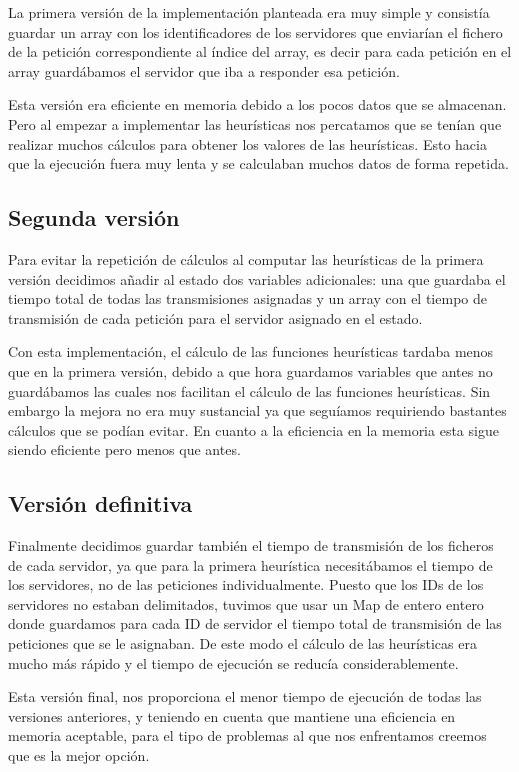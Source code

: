 La primera versión de la implementación planteada era muy simple y consistía guardar un array con los identificadores
de los servidores que enviarían el fichero de la petición correspondiente al índice del array, es decir para cada
petición en el array guardábamos el servidor que iba a responder esa petición.

Esta versión era eficiente en memoria debido a los pocos datos que se almacenan. Pero al empezar a implementar las heurísticas
nos percatamos que se tenían que realizar muchos cálculos para obtener los valores de las heurísticas. Esto hacia que la
ejecución fuera muy lenta y se calculaban muchos datos de forma repetida.

\pagebreak
\subsection{Segunda versión}
Para evitar la repetición de cálculos al computar las heurísticas de la primera versión decidimos añadir al estado
dos variables adicionales: una que guardaba el tiempo total de todas las transmisiones asignadas y un array con
el tiempo de transmisión de cada petición para el servidor asignado en el estado.

Con esta implementación, el cálculo de las funciones heurísticas tardaba menos que en la primera versión,
debido a que hora guardamos variables que antes no guardábamos las cuales nos facilitan el cálculo de las funciones heurísticas.
Sin embargo la mejora no era muy sustancial ya que seguíamos requiriendo bastantes cálculos que se podían evitar.
En cuanto a la eficiencia en la memoria esta sigue siendo eficiente pero menos que antes.

\subsection{Versión definitiva}

Finalmente decidimos guardar también el tiempo de transmisión de los ficheros de cada servidor, ya que para la primera
heurística necesitábamos el tiempo de los servidores, no de las peticiones individualmente.
Puesto que los IDs de los servidores no estaban delimitados, tuvimos que usar un Map de entero entero donde guardamos para cada ID de servidor
el tiempo total de transmisión de las peticiones que se le asignaban. De este modo el cálculo de las heurísticas era
mucho más rápido y el tiempo de ejecución se reducía considerablemente.

Esta versión final, nos proporciona el menor tiempo de ejecución de todas las versiones anteriores, y teniendo en cuenta que mantiene una eficiencia en memoria aceptable, para el tipo de problemas al que nos enfrentamos creemos que es la mejor opción. 


